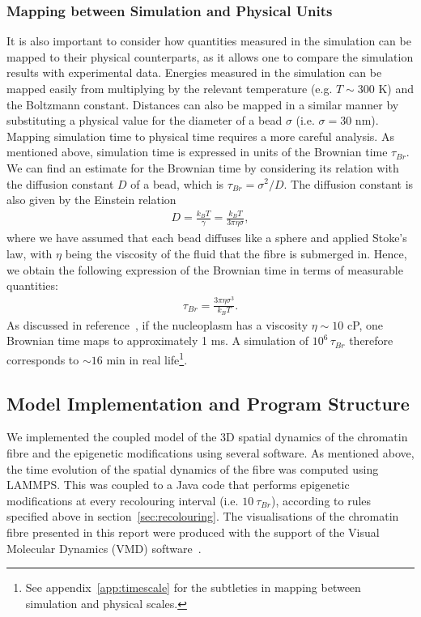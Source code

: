 \documentclass[12pt]{article}
\begin{document}
\subsubsection{Mapping between Simulation and Physical Units}
\label{sec:mapping}
It is also important to consider how quantities measured in the simulation can be mapped to their physical counterparts, as it allows one to compare the simulation results with experimental data. Energies measured in the simulation can be mapped easily from multiplying by the relevant temperature (e.g. $T \sim 300$ K) and the Boltzmann constant. Distances can also be mapped in a similar manner by substituting a physical value for the diameter of a bead $\sigma$ (i.e. $\sigma = 30$ nm). Mapping simulation time to physical time requires a more careful analysis. As mentioned above, simulation time is expressed in units of the Brownian time $\tau_{Br}$. We can find an estimate for the Brownian time by considering its relation with the diffusion constant $D$ of a bead, which is $\tau_{Br} = \sigma^2/D$. The diffusion constant is also given by the Einstein relation
\begin{eqnarray}
D = \frac{k_BT}{\gamma} = \frac{k_BT}{3\pi\eta\sigma},
\end{eqnarray}
where we have assumed that each bead diffuses like a sphere and applied Stoke's law, with $\eta$ being the viscosity of the fluid that the fibre is submerged in. Hence, we obtain the following expression of the Brownian time in terms of measurable quantities:
\begin{eqnarray}
\tau_{Br} = \frac{3\pi\eta\sigma^3}{k_BT}.
\end{eqnarray}
As discussed in reference~\cite{brackley2013}, if the nucleoplasm has a viscosity $\eta \sim 10$ cP, one Brownian time maps to approximately 1 ms. A simulation of $10^6\,\tau_{Br}$ therefore corresponds to $\sim16$ min in real life\footnote{See appendix~\ref{app:timescale} for the subtleties in mapping between simulation and physical scales.}.

\subsection{Model Implementation and Program Structure}
We implemented the coupled model of the 3D spatial dynamics of the chromatin fibre and the epigenetic modifications using several software. As mentioned above, the time evolution of the spatial dynamics of the fibre was computed using LAMMPS. This was coupled to a Java code that performs epigenetic modifications at every recolouring interval (i.e. $10~\tau_{Br}$), according to rules specified above in section~\ref{sec:recolouring}. The visualisations of the chromatin fibre presented in this report were produced with the support of the Visual Molecular Dynamics (VMD) software~\cite{humphrey1996}.
\end{document}
